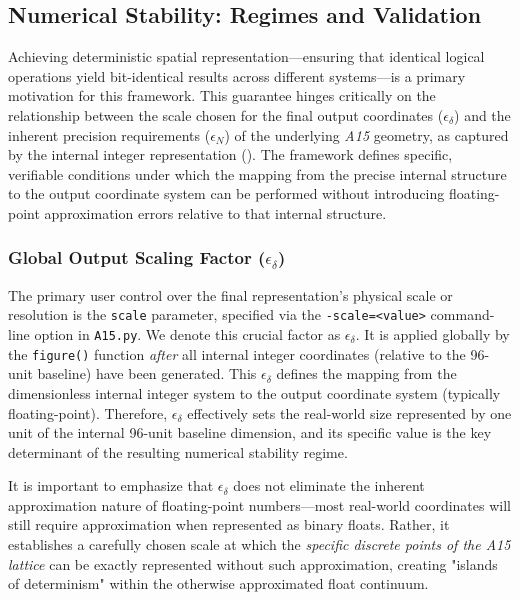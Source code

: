 \documentclass[10pt]{article}
\def\AAAB{\textit{A15}}
\begin{document}
\subsection{Numerical Stability: Regimes and Validation}\label{subsec-stability}

Achieving deterministic spatial representation—ensuring that identical logical operations yield bit-identical results across different systems—is a primary motivation for this framework. This guarantee hinges critically on the relationship between the scale chosen for the final output coordinates ($\epsilon_\delta$) and the inherent precision requirements ($\epsilon_N$) of the underlying \AAAB{} geometry, as captured by the internal integer representation (). The framework defines specific, verifiable conditions under which the mapping from the precise internal structure to the output coordinate system can be performed without introducing floating-point approximation errors relative to that internal structure.

\subsubsection{Global Output Scaling Factor ($\epsilon_\delta$)}\label{subsubsec-stability-epsilon-d}
The primary user control over the final representation's physical scale or resolution is the \texttt{scale} parameter, specified via the \texttt{-scale=<value>} command-line option in \texttt{A15.py}. We denote this crucial factor as $\epsilon_\delta$. It is applied globally by the \texttt{figure()} function \emph{after} all internal integer coordinates (relative to the 96-unit baseline) have been generated. This $\epsilon_\delta$ defines the mapping from the dimensionless internal integer system to the output coordinate system (typically floating-point). Therefore, $\epsilon_\delta$ effectively sets the real-world size represented by one unit of the internal 96-unit baseline dimension, and its specific value is the key determinant of the resulting numerical stability regime.

It is important to emphasize that $\epsilon_\delta$ does not eliminate the inherent approximation nature of floating-point numbers—most real-world coordinates will still require approximation when represented as binary floats. Rather, it establishes a carefully chosen scale at which the \emph{specific discrete points of the \AAAB{} lattice} can be exactly represented without such approximation, creating "islands of determinism" within the otherwise approximated float continuum.
\end{document}
